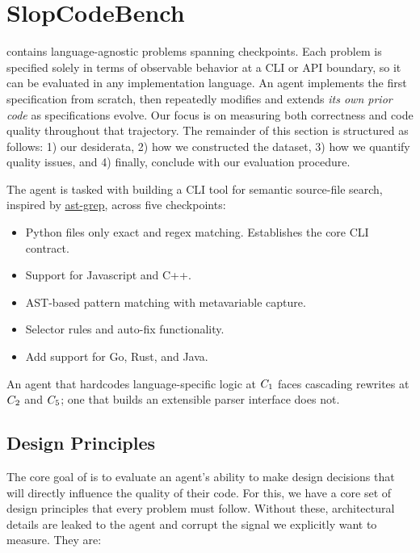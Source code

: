 \section{SlopCodeBench}
\label{sec:benchmark}

\scb{} contains \transProblems{} language-agnostic problems spanning \overallTotalCheckpoints{} checkpoints. Each problem is specified solely in terms of observable behavior at a CLI or API boundary, so it can be evaluated in any implementation language. An agent implements the first specification from scratch, then repeatedly modifies and extends \emph{its own prior code} as specifications evolve. Our focus is on measuring both correctness and code quality throughout that trajectory. The remainder of this section is structured as follows: 1) our desiderata, 2) how we constructed the dataset, 3) how we quantify quality issues, and 4) finally, conclude with our evaluation procedure. 

\begin{runningexample}
\label{sec:running-example}
The agent is tasked with building a CLI tool for semantic source-file search, inspired by \href{https://ast-grep.github.io}{ast-grep}, across five checkpoints:
\begin{itemize}[leftmargin=2.2em, topsep=2pt, itemsep=1pt]
    \item[$\ckpt{1}$ -] Python files only exact and regex matching. Establishes the core CLI contract.
    \item[$\ckpt{2}$ -] Support for Javascript and C++.
    \item[$\ckpt{3}$ -] AST-based pattern matching with metavariable capture.
    \item[$\ckpt{4}$ -] Selector rules and auto-fix functionality.
    \item[$\ckpt{5}$ -] Add support for Go, Rust, and Java.
\end{itemize}

An agent that hardcodes language-specific logic at $\ckpt{1}$ faces cascading rewrites at $\ckpt{2}$ and $\ckpt{5}$; one that builds an extensible parser interface does not.
\end{runningexample}
\subsection{Design Principles}\label{sec:design-principles}

The core goal of \scb{} is to evaluate an agent's ability to make design decisions that will directly influence the quality of their code. For this, we have a core set of design principles that every problem must follow. Without these, architectural details are leaked to the agent and corrupt the signal we explicitly want to measure. They are:

